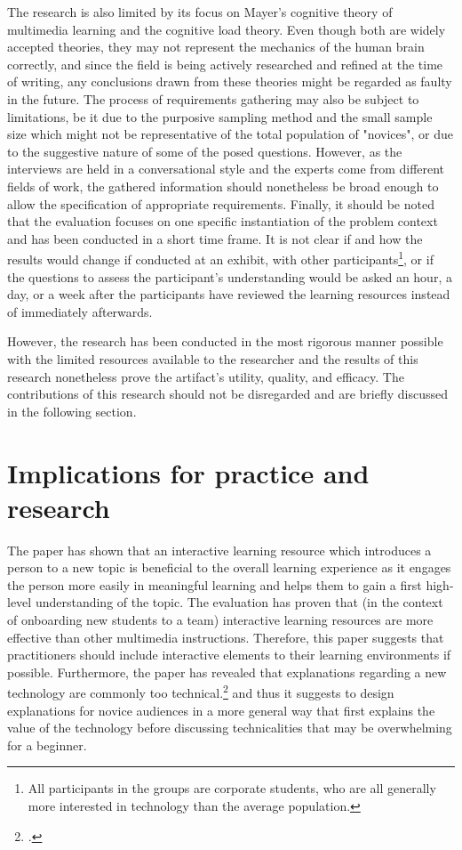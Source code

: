 The research is also limited by its focus on Mayer's cognitive theory of multimedia learning and the cognitive load theory. Even though both are widely accepted theories, they may not represent the mechanics of the human brain correctly, and since the field is being actively researched and refined at the time of writing, any conclusions drawn from these theories might be regarded as faulty in the future. The process of requirements gathering may also be subject to limitations, be it due to the purposive sampling method and the small sample size which might not be representative of the total population of "novices", or due to the suggestive nature of some of the posed questions. However, as the interviews are held in a conversational style and the experts come from different fields of work, the gathered information should nonetheless be broad enough to allow the specification of appropriate requirements. Finally, it should be noted that the evaluation focuses on one specific instantiation of the problem context and has been conducted in a short time frame. It is not clear if and how the results would change if conducted at an exhibit, with other participants\footnote{All participants in the groups are corporate students, who are all generally more interested in technology than the average population.}, or if the questions to assess the participant's understanding would be asked an hour, a day, or a week after the participants have reviewed the learning resources instead of immediately afterwards.

However, the research has been conducted in the most rigorous manner possible with the limited resources available to the researcher and the results of this research nonetheless prove the artifact's utility, quality, and efficacy. The contributions of this research should not be disregarded and are briefly discussed in the following section. 

\section{Implications for practice and research} \label{Implications}
The paper has shown that an interactive learning resource which introduces a person to a new topic is beneficial to the overall learning experience as it engages the person more easily in meaningful learning and helps them to gain a first high-level understanding of the topic. The evaluation has proven that (in the context of onboarding new students to a team) interactive learning resources are more effective than other multimedia instructions. Therefore, this paper suggests that practitioners should include interactive elements to their learning environments if possible. Furthermore, the paper has revealed that explanations regarding a new technology are commonly too technical.\footcite[Cf.][]{DanielKaltenbach_Interview} and thus it suggests to design explanations for novice audiences in a more general way that first explains the value of the technology before discussing technicalities that may be overwhelming for a beginner.

